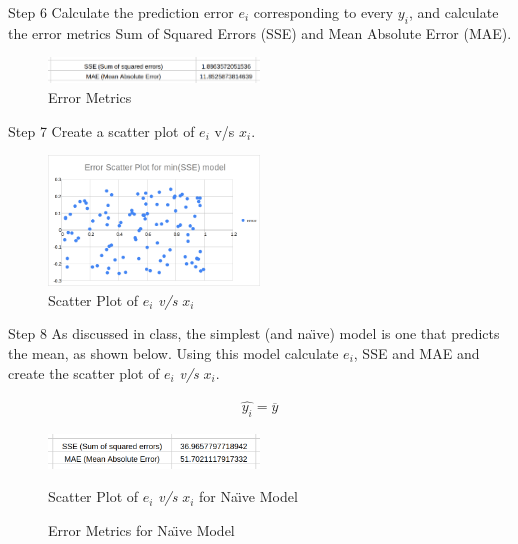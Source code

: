 \begin{custombox}[label={box:step6}]{Step 6}
	Calculate the prediction error $e_i$ corresponding to every $y_i$, and calculate the error metrics Sum of Squared Errors (SSE) and Mean Absolute Error (MAE).
\end{custombox}

\begin{figure}[H]
	\centering
	\includegraphics[width=0.5\textwidth]{Images/Step6.png}
	\caption{Error Metrics}
\end{figure}

\begin{custombox}[label={box:step7}]{Step 7}
	Create a scatter plot of $e_i$ v/s $x_i$.
\end{custombox}

\begin{figure}[H]
	\centering
	\includegraphics[width=0.5\textwidth]{Images/error1.png}
	\caption{Scatter Plot of $e_i$ \textit{v/s} $x_i$}
\end{figure}

\begin{custombox}[label={box:step8}] {Step 8}
	As discussed in class, the simplest (and na\"{\i}ve) model is one that predicts the mean, as shown below. Using this model calculate $e_i$, SSE and MAE and create the scatter plot of $e_i$ \textit{v/s} $x_i$.

	\begin{align}
		\widehat{y_i} = \overline{y}
	\end{align}
\end{custombox}

\begin{figure}[H]
	\centering
	\includegraphics[width=0.5\textwidth]{Images/Step8.png}
	\caption{Scatter Plot of $e_i$ \textit{v/s} $x_i$ for Na\"{\i}ve Model}
	\caption{Error Metrics for Na\"{\i}ve Model}
\end{figure}


